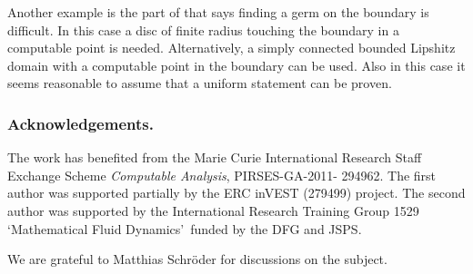 \documentclass{eptcs-modified}
\begin{document}
		Another example is the part of  that says finding a germ on the boundary is difficult.
		In this case a disc of finite radius touching the boundary in a computable point is needed.
		Alternatively, a simply connected bounded Lipshitz domain with a computable point in the boundary can be used.
		Also in this case it seems reasonable to assume that a uniform statement can be proven.
		
		
		
		

	\subsubsection*{Acknowledgements.}
		The work has benefited from the Marie Curie International Research Staff Exchange Scheme \emph{Computable Analysis}, PIRSES-GA-2011- 294962. The first author was supported partially by the ERC inVEST (279499) project. The second author was supported by the International Research Training Group 1529 \lq Mathematical Fluid Dynamics\rq\ funded by the DFG and JSPS.

We are grateful to Matthias Schr\"oder for discussions on the subject.
\end{document}
